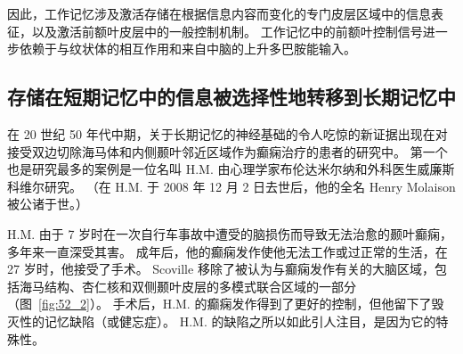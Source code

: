 因此，工作记忆涉及激活存储在根据信息内容而变化的专门皮层区域中的信息表征，以及激活前额叶皮层中的一般控制机制。
工作记忆中的前额叶控制信号进一步依赖于与纹状体的相互作用和来自中脑的上升多巴胺能输入。



\subsection{存储在短期记忆中的信息被选择性地转移到长期记忆中}

在 20 世纪 50 年代中期，关于长期记忆的神经基础的令人吃惊的新证据出现在对接受双边切除海马体和内侧颞叶邻近区域作为癫痫治疗的患者的研究中。
第一个也是研究最多的案例是一位名叫 H.M. 由心理学家布伦达米尔纳和外科医生威廉斯科维尔研究。 （在 H.M. 于 2008 年 12 月 2 日去世后，他的全名 Henry Molaison 被公诸于世。）


H.M. 由于 7 岁时在一次自行车事故中遭受的脑损伤而导致无法治愈的颞叶癫痫，多年来一直深受其害。
成年后，他的癫痫发作使他无法工作或过正常的生活，在 27 岁时，他接受了手术。
Scoville 移除了被认为与癫痫发作有关的大脑区域，包括海马结构、杏仁核和双侧颞叶皮层的多模式联合区域的一部分（图~\ref{fig:52_2}）。
手术后，H.M. 的癫痫发作得到了更好的控制，但他留下了毁灭性的记忆缺陷（或健忘症）。
H.M. 的缺陷之所以如此引人注目，是因为它的特殊性。


